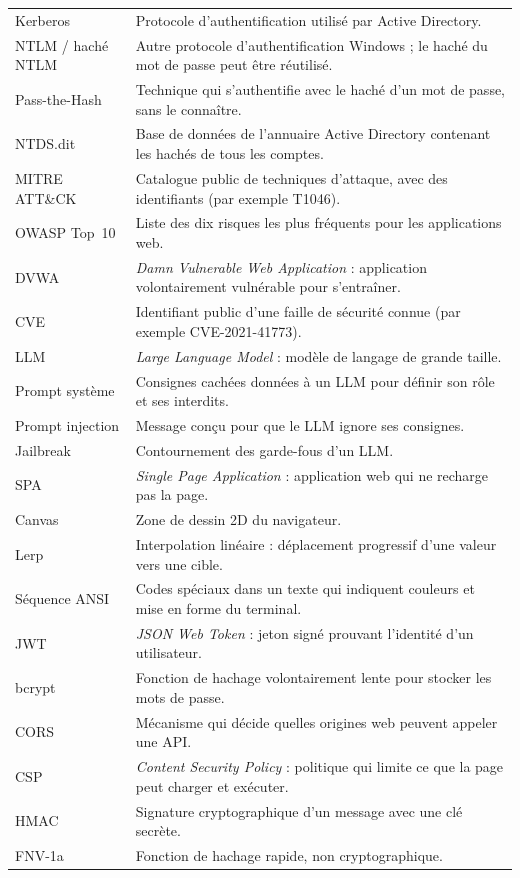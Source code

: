 \documentclass[11pt,a4paper]{report}
\begin{document}
\begin{longtable}{@{}p{3.6cm}p{11.2cm}@{}}
Kerberos & Protocole d'authentification utilis\'e par Active Directory. \\
NTLM / hach\'e NTLM & Autre protocole d'authentification Windows ; le hach\'e du mot de passe peut \^etre r\'eutilis\'e. \\
Pass-the-Hash & Technique qui s'authentifie avec le hach\'e d'un mot de passe, sans le conna\^itre. \\
NTDS.dit & Base de donn\'ees de l'annuaire Active Directory contenant les hach\'es de tous les comptes. \\
MITRE ATT\&CK & Catalogue public de techniques d'attaque, avec des identifiants (par exemple T1046). \\
OWASP Top~10 & Liste des dix risques les plus fr\'equents pour les applications web. \\
DVWA & \emph{Damn Vulnerable Web Application} : application volontairement vuln\'erable pour s'entra\^iner. \\
CVE & Identifiant public d'une faille de s\'ecurit\'e connue (par exemple CVE-2021-41773). \\
LLM & \emph{Large Language Model} : mod\`ele de langage de grande taille. \\
Prompt syst\`eme & Consignes cach\'ees donn\'ees \`a un LLM pour d\'efinir son r\^ole et ses interdits. \\
Prompt injection & Message con\c cu pour que le LLM ignore ses consignes. \\
Jailbreak & Contournement des garde-fous d'un LLM. \\
SPA & \emph{Single Page Application} : application web qui ne recharge pas la page. \\
Canvas & Zone de dessin 2D du navigateur. \\
Lerp & Interpolation lin\'eaire : d\'eplacement progressif d'une valeur vers une cible. \\
S\'equence ANSI & Codes sp\'eciaux dans un texte qui indiquent couleurs et mise en forme du terminal. \\
JWT & \emph{JSON Web Token} : jeton sign\'e prouvant l'identit\'e d'un utilisateur. \\
bcrypt & Fonction de hachage volontairement lente pour stocker les mots de passe. \\
CORS & M\'ecanisme qui d\'ecide quelles origines web peuvent appeler une API. \\
CSP & \emph{Content Security Policy} : politique qui limite ce que la page peut charger et ex\'ecuter. \\
HMAC & Signature cryptographique d'un message avec une cl\'e secr\`ete. \\
FNV-1a & Fonction de hachage rapide, non cryptographique. \\
\bottomrule
\end{longtable}
\end{document}
